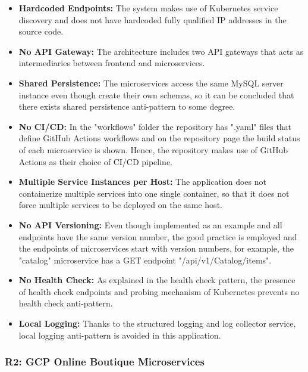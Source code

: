 \documentclass{Configuration_Files/PoliMi3i_thesis}
\begin{document}
\begin{itemize}
    \item \textbf{Hardcoded Endpoints:} The system makes use of Kubernetes service discovery and does not have hardcoded fully qualified IP addresses in the source code.
    
    \item \textbf{No API Gateway:} The architecture includes two API gateways that acts as intermediaries between frontend and microservices.
    
    \item \textbf{Shared Persistence:} The microservices access the same MySQL server instance even though create their own schemas, so it can be concluded that there exists shared persistence anti-pattern to some degree.
    
    \item \textbf{No CI/CD:} In the "workflows" folder the repository has ".yaml" files that define GitHub Actions\footnotemark[71] workflows and on the repository page the build status of each microservice is shown.
    Hence, the repository makes use of GitHub Actions as their choice of CI/CD pipeline.
    
    \item \textbf{Multiple Service Instances per Host:} The application does not containerize multiple services into one single container, so that it does not force multiple services to be deployed on the same host.
    
    \item \textbf{No API Versioning:} Even though implemented as an example and all endpoints have the same version number, the good practice is employed and the endpoints of microservices start with version numbers, for example, the "catalog" microservice has a GET endpoint "/api/v1/Catalog/items".
    
    \item \textbf{No Health Check:} As explained in the health check pattern, the presence of health check endpoints and probing mechanism of Kubernetes prevents no health check anti-pattern.
    
    \item \textbf{Local Logging:} Thanks to the structured logging and log collector service, local logging anti-pattern is avoided in this application.
\end{itemize}

\subsubsection{R2: GCP Online Boutique Microservices}
\label{subsubsec:R2}
\end{document}
